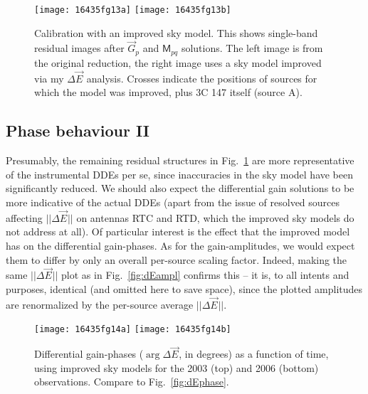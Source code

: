 \documentclass{aa}
\newcommand{\jones}[2]{\vec {#1}_{#2}}
\newcommand{\coh}[2]{\mathsf{{#1}}_{{#2}}}
\begin{document}
\begin{figure}
\begin{centering}
\texttt{[image: 16435fg13a]}%
\texttt{[image: 16435fg13b]}\par
\end{centering}
\caption{\label{fig:residuals-newmodel}Calibration with an improved sky model. This shows single-band residual images after $\jones{G}{p}$ and $\coh{M}{pq}$ solutions. The left image is from the original reduction, the right image uses a sky model improved via my $\Delta\jones{E}{}$ analysis. Crosses indicate the positions of sources for which the model was improved, plus 3C 147 itself (source A).}
\end{figure}

\subsection{Phase behaviour II\label{sec:de-analysis-phase2}}

Presumably, the remaining residual structures in Fig.~\ref{fig:residuals-newmodel} are more representative of the instrumental DDEs per se, since inaccuracies in the sky model have been significantly reduced. We should also expect the differential gain solutions to be more indicative of the actual DDEs (apart from the issue of resolved sources affecting $||\Delta\jones{E}{}||$ on antennas RTC and RTD, which the improved sky models do not address at all). Of particular interest is the effect that the improved model has on the differential gain-phases. As for the gain-amplitudes, we would expect them to differ by only an overall per-source scaling factor. Indeed, making the same $||\Delta\jones{E}{}||$ plot as in Fig.~\ref{fig:dEampl} confirms this -- it is, to all intents and purposes, identical (and omitted here to save space), since the plotted amplitudes are renormalized by the per-source average $||\Delta\jones{E}{}||$.

\begin{figure*}
\sidecaption
\parbox[b]{12cm}{
\texttt{[image: 16435fg14a]}
\texttt{[image: 16435fg14b]}
}
\caption{\label{fig:new-dEphase}Differential gain-phases ($\arg\Delta\jones{E}{}$, in degrees) as a function of time, using improved sky models for the 2003 (top) and 2006 (bottom) observations. Compare to Fig.~\ref{fig:dEphase}.}
\end{figure*}
\end{document}
